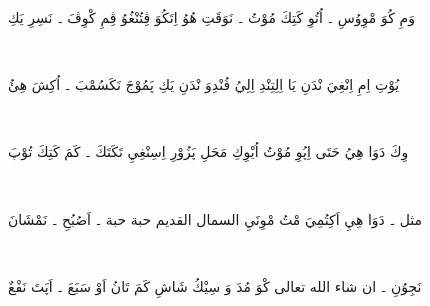 \documentclass[a4paper, 12pt]{report}
\begin{document}
\begin{flushright}
{{{{{{{{{{\textarabic{وَمِ كُوَ مْوِوُسِ ۔ اُتُوِ كَتِكَ مُوْتُ ۔ نَوَقَتِ هُوُ اِتَكُوَ ڤِتُنْغُوُ ڤِمِ كْوِڤَ ۔ نَسِرِ يَكِ} \\ 

 \vspace{10mm} 

 \\ 

 \vspace{10mm} 

{\textarabic{يُوْتِ اِمِ اِنْغِيَ نْدَنِ يَا اِلِتِنْدِ اِلِيُ فُنْدِوَ نْدَنِ يَكِ پَمُوْجَ نَكَسُمْبَ ۔ اُكِشَ هِئُ } \\ 

 \vspace{10mm} 

 \\ 

 \vspace{10mm} 

{\textarabic{وِكَ دَوَا هِيُ حَتَى اِپُوِ مُوْتُ اُيْوِكِ مَحَلِ پَزُوْرِ اِسِنْغِيِ تَكَتَكَ ۔ كَمَ كَتِكَ تُوْپَ} \\ 

 \vspace{10mm} 

 \\ 

 \vspace{10mm} 

{\textarabic{مثل ۔ دَوَا هِيِ اَكِتُمِيَ مْتُ مْوِنَيِ السمال القديم حبة حبة ۔ اَصُبُحِ ۔ نَمْشَانَ} \\ 

 \vspace{10mm} 

 \\ 

 \vspace{10mm} 

{\textarabic{نَجِوُنِ ۔ ان شاء الله تعالى كْوَ مُدَ وَ سِيْكُ شَاشِ كَمَ تَانُ اَوْ سَبَعَ ۔ اَپَتَ نَفْعٌ} \\ 

 \vspace{10mm} 

}}}}}}}}}}}}}}
\end{flushright}
\end{document}
